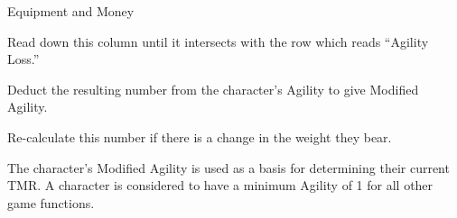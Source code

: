 \begin{Chapter}{Equipment and Money}
\begin{Enumerate}
\item Read down this column until it intersects with the row which
  reads “Agility Loss.”

\item Deduct the resulting number from the character’s Agility to give
  Modified Agility.

\item Re-calculate this number if there is a change in the weight they
  bear.

\end{Enumerate}

The character’s Modified Agility is used as a basis for determining
their current TMR.  A character is considered to have a minimum
Agility of 1 for all other game functions.

\end{Chapter}
